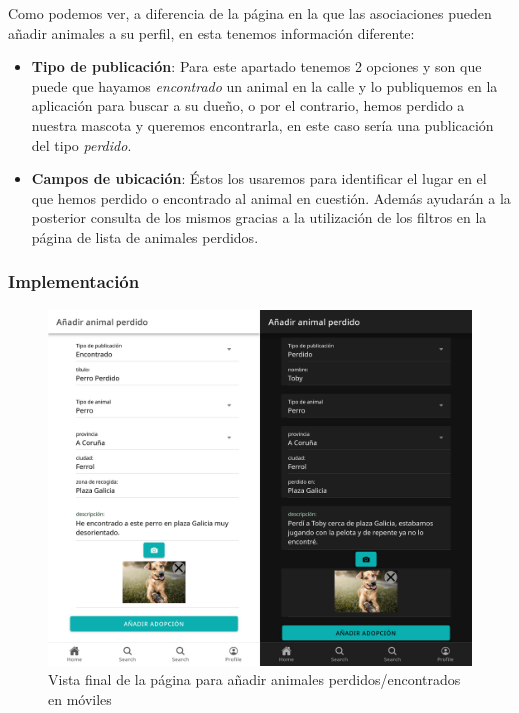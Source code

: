 Como podemos ver, a diferencia de la página en la que las asociaciones pueden añadir animales a su perfil, en esta tenemos información diferente:

\begin{itemize}
	\item \textbf{Tipo de publicación}: Para este apartado tenemos 2 opciones y son que puede que hayamos \textit{encontrado} un animal en la calle y lo publiquemos en la aplicación para buscar a su dueño, o por el contrario, hemos perdido a nuestra mascota y queremos encontrarla, en este caso sería una publicación del tipo \textit{perdido}. \\ 
	
	\item \textbf{Campos de ubicación}: Éstos los usaremos para identificar el lugar en el que hemos perdido o encontrado al animal en cuestión. Además ayudarán a la posterior consulta de los mismos gracias a la utilización de los filtros en la página de lista de animales perdidos. \\
	
\end{itemize}

\subsubsection{Implementación}

\begin{figure}[H]
	\centering
	\includegraphics[width=0.8\linewidth]{"sprint 2/hu4/impPerdidos"}
	\caption{Vista final de la página para añadir animales perdidos/encontrados en móviles}
	\label{fig:impperdidos}
\end{figure}

